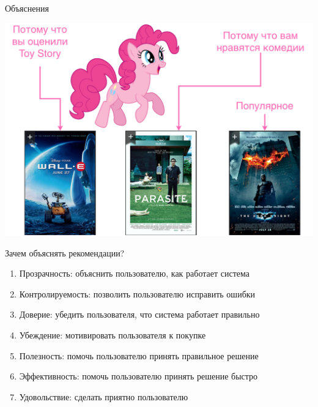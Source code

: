 \documentclass[11pt,aspectratio=169]{beamer}
\begin{document}
\begin{frame}{Объяснения}

\begin{center}
\includegraphics[scale=0.22]{images/explainability-2.png}
\end{center}

\end{frame}

\begin{frame}{Зачем объяснять рекомендации?}

\begin{enumerate}[<+->]
\item Прозрачность: объяснить пользователю, как работает система
\item Контролируемость: позволить пользователю исправить ошибки
\item Доверие: убедить пользователя, что система работает правильно
\item Убеждение: мотивировать пользователя к покупке
\item Полезность: помочь пользователю принять правильное решение
\item Эффективность: помочь пользователю принять решение быстро
\item Удовольствие: сделать приятно пользователю
\end{enumerate}

\end{frame}
\end{document}
